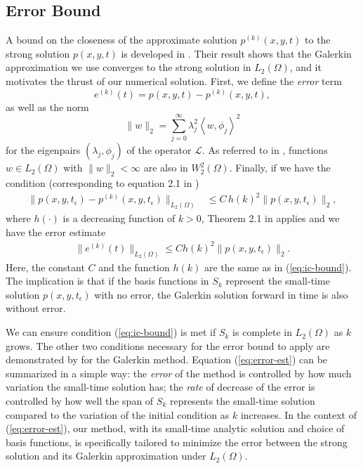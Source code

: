 \documentclass[10pt]{article}
\begin{document}
\subsection{Error Bound} \label{sec:error-bound}
A bound on the closeness of the approximate solution $p^{(k)}(x,y,t)$
to the strong solution $p(x,y,t)$ is developed in
\cite{bramble1977some}.  Their result shows that the Galerkin
approximation we use converges to the strong solution in
$L_2(\Omega)$, and it motivates the thrust of our numerical
solution. First, we define the \textit{error} term
\[
  e^{(k)}(t) = p(x,y,t) - p^{(k)}(x,y,t),
\]
as well as the norm
\[
  \| w \|_2 = \sum_{j=0}^\infty \lambda_j^2 \left<w, \phi_j\right>^2
\]
for the eigenpairs $(\lambda_j, \phi_j)$ of the operator
$\mathcal{L}$. As referred to in \cite{bramble1977some}, functions
$w \in L_2(\Omega)$ with $\|w\|_2 < \infty$ are also in
$W_2^2(\Omega)$. Finally, if we have the condition (corresponding to
equation 2.1 in \cite{bramble1977some})
\begin{align}
  \| p(x,y,t_\epsilon) - p^{(k)}(x,y,t_\epsilon) \|_{L_2(\Omega)} &\leq C\, h(k)^2 \| p(x,y,t_\epsilon) \|_2, \label{eq:ic-bound}
\end{align}
where $h(\cdot)$ is a decreasing function of $k > 0$, Theorem 2.1 in
\cite{bramble1977some} applies and we have the error estimate
\begin{align}
  \| e^{(k)}(t) \|_{L_2(\Omega)} \leq C h(k)^2 \| p(x,y,t_\epsilon) \|_{2}. \label{eq:error-est}
\end{align}
Here, the  constant $C$  and the  function $h(k)$ are  the same  as in
(\ref{eq:ic-bound}). The implication is that if the basis functions in
$S_k$ represent  the small-time  solution $p(x,y,t_\epsilon)$  with no
error, the Galerkin solution forward in time is also without error.

We can ensure condition (\ref{eq:ic-bound}) is met if $S_k$ is
complete in $L_2(\Omega)$ as $k$ grows. The other two conditions
necessary for the error bound to apply are demonstrated by
\cite{bramble1977some} for the Galerkin method. Equation
(\ref{eq:error-est}) can be summarized in a simple way: the
\textit{error} of the method is controlled by how much variation the
small-time solution has; the \textit{rate} of decrease of the error is
controlled by how well the span of $S_k$ represents the small-time
solution compared to the variation of the initial condition as $k$
increases. In the context of (\ref{eq:error-est}), our method, with
its small-time analytic solution and choice of basis functions, is
specifically tailored to minimize the error between the strong
solution and its Galerkin approximation under $L_2(\Omega)$.
\end{document}
